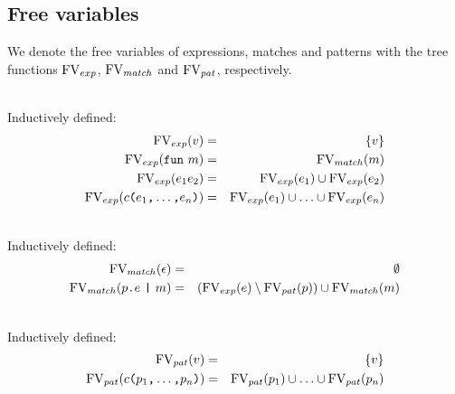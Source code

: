 

\subsection{Free variables}\label{sec:free-variables}

We denote the free variables of expressions, matches and patterns with the tree
functions $\mathrm{FV}_{exp}$, $\mathrm{FV}_{match}$ and $\mathrm{FV}_{pat}$, respectively.

\begin{definition} \ \\
  Inductively defined:
  \begin{eqnarray}
    \mathrm{FV}_{exp} (v) &=& \{v\} \\
    \mathrm{FV}_{exp} (\texttt{fun}\  m) &=& \mathrm{FV}_{match} (m) \\
    \mathrm{FV}_{exp} (e_1e_2) &=& \mathrm{FV}_{exp} (e_1) \cup \mathrm{FV}_{exp} (e_2) \\
    \mathrm{FV}_{exp} (c\texttt{(}e_1\texttt{,} \ldots \texttt{,} e_n \texttt{)}) &=& \mathrm{FV}_{exp}
    (e_1) \cup \ldots \cup \mathrm{FV}_{exp} (e_n)
  \end{eqnarray}
\end{definition}

\begin{definition}\ \\
  Inductively defined:
  \begin{eqnarray}
    \mathrm{FV}_{match} (\epsilon) &=& \emptyset \\
    \mathrm{FV}_{match} (p\texttt{.}e\ \texttt{|}\ m) &=& \left( \mathrm{FV}_{exp}(e) \setminus
      \mathrm{FV}_{pat}(p) \right) \cup \mathrm{FV}_{match} (m)
  \end{eqnarray}
\end{definition}

\begin{definition} \ \\
  Inductively defined:
  \begin{eqnarray}
    \mathrm{FV}_{pat} (v) &=& \{v\} \\
    \mathrm{FV}_{pat} (c\texttt{(}p_1\texttt{,} \ldots \texttt{,} p_n\texttt{)}) &=& \mathrm{FV}_{pat} (p_1)
    \cup \ldots \cup \mathrm{FV}_{pat} (p_n)
  \end{eqnarray}
\end{definition}

